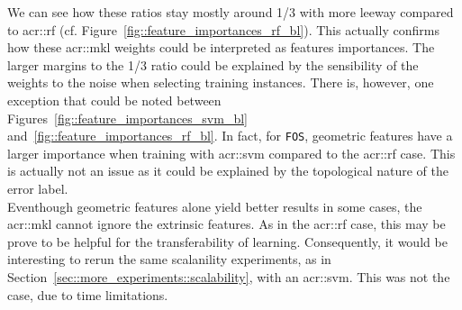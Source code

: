         We can see how these ratios stay mostly around \num[fraction-function = \sfrac]{1/3} with more leeway compared to \gls{acr::rf} (cf. Figure~\ref{fig::feature_importances_rf_bl}).
        This actually confirms how these \gls{acr::mkl} weights could be interpreted as features importances.
        The larger margins to the \num[fraction-function = \sfrac]{1/3} ratio could be explained by the sensibility of the weights to the noise when selecting training instances.
        There is, however, one exception that could be noted between Figures~\ref{fig::feature_importances_svm_bl} and~\ref{fig::feature_importances_rf_bl}.
        In fact, for \texttt{FOS}, geometric features have a larger importance when training with \gls{acr::svm} compared to the \gls{acr::rf} case.
        This is actually not an issue as it could be explained by the topological nature of the error label.\\

        Eventhough geometric features alone yield better results in some cases, the \gls{acr::mkl} cannot ignore the extrinsic features.
        As in the \gls{acr::rf} case, this may be prove to be helpful for the transferability of learning.
        Consequently, it would be interesting to rerun the same scalanility experiments, as in Section~\ref{sec::more_experiments::scalability}, with an \gls{acr::svm}.
        This was not the case, due to time limitations.


